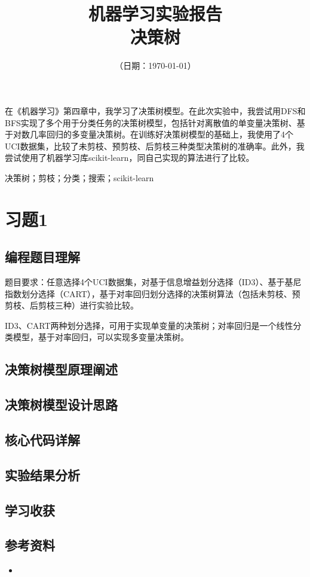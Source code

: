 \documentclass{ctexart}
\title{\textbf{机器学习实验报告\\{\Large{决策树}}}} %
\author{\sffamily{朱天泽}} %
\date{（日期：\today）} %
\begin{document}
	\maketitle\thispagestyle{fancy}
	在《机器学习》第四章中，我学习了决策树模型。在此次实验中，我尝试用DFS和BFS实现了多个用于分类任务的决策树模型，包括针对离散值的单变量决策树、基于对数几率回归的多变量决策树。在训练好决策树模型的基础上，我使用了4个UCI数据集，比较了未剪枝、预剪枝、后剪枝三种类型决策树的准确率。此外，我尝试使用了机器学习库scikit-learn，同自己实现的算法进行了比较。
	
	 决策树；剪枝；分类；搜索；scikit-learn
	
	\section{习题1}
	\subsection{编程题目理解}
	题目要求：任意选择4个UCI数据集，对基于信息增益划分选择（ID3）、基于基尼指数划分选择（CART），基于对率回归划分选择的决策树算法（包括未剪枝、预剪枝、后剪枝三种）进行实验比较。
	
	ID3、CART两种划分选择，可用于实现单变量的决策树；对率回归是一个线性分类模型，基于对率回归，可以实现多变量决策树。
	\subsection{决策树模型原理阐述}
	
	\subsection{决策树模型设计思路}
	
	\subsection{核心代码详解} 
	\subsection{实验结果分析}

	\subsection{学习收获}
	
	\subsection{参考资料}   
	\begin{itemize}
		\item
	\end{itemize}
\end{document}
